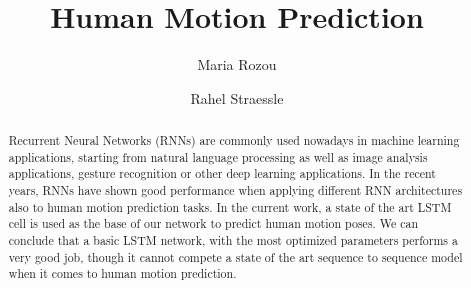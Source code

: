\documentclass[sigconf]{acmart}
\begin{document}
\title{Human Motion Prediction}

\author{Maria Rozou}\affiliation{}

\author{Rahel Straessle}\affiliation{}

\begin{abstract}
Recurrent Neural Networks (RNNs) are commonly used nowadays in machine learning applications, starting from natural language processing  as well as image analysis applications, gesture recognition or other deep learning applications. In the recent years, RNNs have shown good performance when applying different RNN architectures also to human motion prediction tasks. In the current work, a state of the art LSTM cell is used as the base of our network to predict human motion poses. We can conclude that a basic LSTM network, with the most optimized parameters performs a very good job, though it cannot compete a state of the art sequence to sequence model when it comes to human motion prediction.
\end{abstract}

\maketitle





\end{document}
